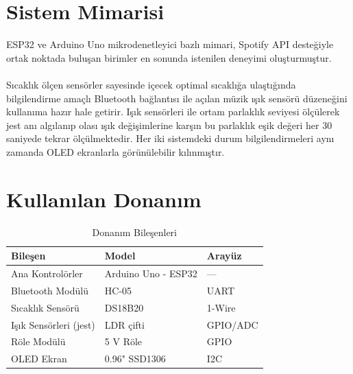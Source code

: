 \documentclass[12pt, a4paper]{article}
\begin{document}
\section{Sistem Mimarisi}

ESP32 ve Arduino Uno mikrodenetleyici bazlı mimari,  Spotify API desteğiyle ortak noktada buluşan birimler en sonunda istenilen deneyimi oluşturmuştur.\\ \\

Sıcaklık ölçen sensörler sayesinde içecek optimal sıcaklığa ulaştığında bilgilendirme amaçlı Bluetooth bağlantısı ile açılan müzik ışık sensörü düzeneğini kullanıma hazır hale getirir. Işık sensörleri ile ortam parlaklık seviyesi ölçülerek jest anı algılanıp olası ışık değişimlerine karşın bu parlaklık eşik değeri her 30 saniyede tekrar ölçülmektedir. Her iki sistemdeki durum bilgilendirmeleri aynı zamanda OLED ekranlarla görünülebilir kılınmıştır.


\section{Kullanılan Donanım}

\begin{table}[H]
  \centering
  \caption{Donanım Bileşenleri}
  \label{tab:donanim}
  \begin{tabular}{lll}
    \toprule
    \textbf{Bileşen}          & \textbf{Model}      & \textbf{Arayüz} \\
    \midrule
    Ana Kontrolörler             & Arduino Uno - ESP32         & —         \\
    Bluetooth Modülü          & HC-05               & UART      \\
    Sıcaklık Sensörü          & DS18B20             & 1-Wire    \\
    Işık Sensörleri (jest)       & LDR çifti           & GPIO/ADC  \\
    Röle Modülü               & 5 V Röle            & GPIO      \\
    OLED Ekran                & 0.96" SSD1306       & I2C       \\
    \bottomrule
  \end{tabular}
\end{table}
\end{document}
